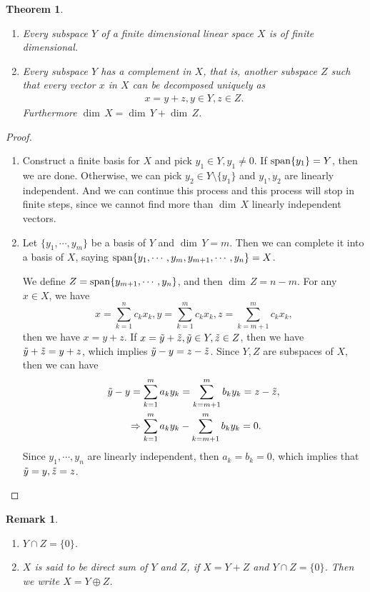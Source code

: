 \documentclass[11pt]{book}
\newtheorem{theorem}{Theorem}[chapter]
\newtheorem{remark}{Remark}[chapter]
\theoremstyle{definition}
\numberwithin{equation}{chapter}
\begin{document}
\medskip

\begin{theorem}
~\begin{enumerate}[label=(\alph*)]
    \item Every subspace $Y$ of a finite dimensional linear space $X$ is of finite dimensional.
    \item Every subspace $Y$ has a complement in $X$, that is, another subspace $Z$ such that every vector $x$ in $X$ can be decomposed uniquely as
    \begin{align*}
        x = y + z, y\in Y, z\in Z.
    \end{align*}
    Furthermore $ \dim \,X =  \dim \,Y +  \dim \,Z$.
\end{enumerate}
\end{theorem}
\begin{proof}
~\begin{enumerate}[label=(\alph*)]
    \item Construct a finite basis for $X$ and pick $y_1\in Y, y_1\neq 0$. If ${\rm span}\{y_1\} = Y$, then we are done. Otherwise, we can pick $y_2\in Y\setminus\{y_1\}$ and $y_1, y_2$ are linearly independent. And we can continue this process and this process will stop in finite steps, since we cannot find more than $ \dim \,X$ linearly independent vectors. 
    \item Let $\{y_1, \cdots, y_m\}$ be a basis of $Y$ and $ \dim \,Y = m$. Then we can complete it into a basis of $X$, saying ${\rm span}\{y_1, \cdots, y_m, y_{m+1},\cdots, y_n\} = X$. 
    
    We define $Z = {\rm span}\{y_{m+1},\cdots, y_n\}$, and then $ \dim \,Z = n - m$. For any $x\in X$, we have 
    $$x = \sum^n_{k=1}c_k x_k, y = \sum^m_{k=1}c_k x_k, z = \sum^m_{k=m+1}c_k x_k,$$ 
    then we have $x = y+z$. If $x = \Tilde{y} + \Tilde{z}, \Tilde{y}\in Y, \Tilde{z}\in Z$, then we have $\Tilde{y} + \Tilde{z} = y + z$, which implies $\Tilde{y} - y = z - \Tilde{z}$. Since $Y,Z$ are subspaces of $X$, then we can have 
    \begin{align*}
        \Tilde{y} - y = \sum^m_{k=1}a_ky_k & = \sum^m_{k=m+1}b_ky_k = z - \Tilde{z}, \\
        \Rightarrow \sum^m_{k=1}a_ky_k & - \sum^m_{k=m+1}b_ky_k = 0.
    \end{align*}
    Since $y_1,\cdots, y_n$ are linearly independent, then $a_k = b_k = 0$, which implies that $\Tilde{y}=y, \Tilde{z}=z$.
\end{enumerate}
\end{proof}
\begin{remark}
~\begin{enumerate}[label=(\arabic*)]
    \item $Y\cap Z = \{0\}$.
    \item $X$ is said to be direct sum of $Y$ and $Z$, if $X = Y+Z$ and $Y\cap Z = \{0\}$. Then we write $X = Y \oplus Z$.
\end{enumerate}
\end{remark}
\end{document}
